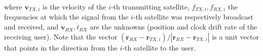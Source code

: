%
where $\bm v_{TX,i}$ is the velocity of the $i$-th transmitting
satellite, $f_{TX,i}, f_{RX,i}$ the frequencies at which the signal from the 
$i$-th satellite was respectively broadcast and received,
and $\bm v_{RX}, \dot{t}_{RX}$ are the unknowns (position and 
clock drift rate of the receiving user). Note that the vector
$(\bm r_{RX}-\bm r_{TX,i})/\left|\bm r_{RX}-\bm r_{TX,i}\right|$ is a unit 
vector that points in the direction from the $i$-th satellite to the user.
